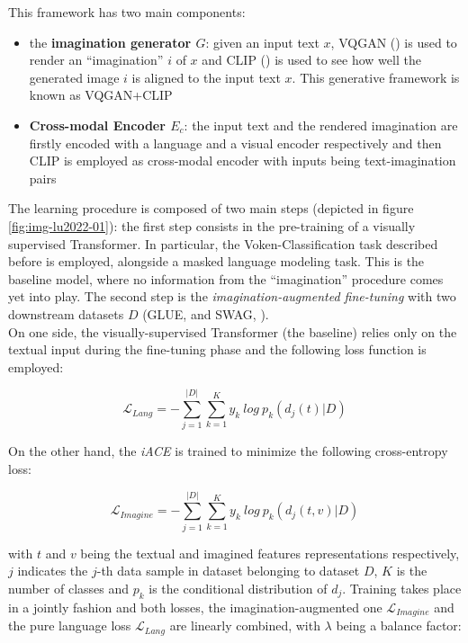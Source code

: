 \documentclass[
]{krantz}
\providecommand{\tightlist}{%
  \setlength{\itemsep}{0pt}\setlength{\parskip}{0pt}}
\begin{document}
This framework has two main components:

\begin{itemize}
\tightlist
\item
  the \textbf{imagination generator \(G\)}: given an input text \(x\), VQGAN (\citet{esser2021taming}) is used to render an ``imagination'' \(i\) of \(x\) and CLIP (\citet{radford2021learning}) is used to see how well the generated image \(i\) is aligned to the input text \(x\). This generative framework is known as VQGAN+CLIP
\item
  \textbf{Cross-modal Encoder \(E_c\)}: the input text and the rendered imagination are firstly encoded with a language and a visual encoder respectively and then CLIP is employed as cross-modal encoder with inputs being text-imagination pairs
\end{itemize}

The learning procedure is composed of two main steps (depicted in figure \ref{fig:img-lu2022-01}): the first step consists in the pre-training of a visually supervised Transformer. In particular, the Voken-Classification task described before is employed, alongside a masked language modeling task. This is the baseline model, where no information from the ``imagination'' procedure comes yet into play. The second step is the \emph{imagination-augmented fine-tuning} with two downstream datasets \(D\) (GLUE, \citet{wang2018glue} and SWAG, \citet{zellers2018swag}).\\
On one side, the visually-supervised Transformer (the baseline) relies only on the textual input during the fine-tuning phase and the following loss function is employed:

\[ \mathcal{L}_{Lang}=-\sum_{j=1}^{|D|}\sum_{k=1}^{K}y_{k}\ log\ p_{k}(d_{j}(t)|D) \]

On the other hand, the \emph{iACE} is trained to minimize the following cross-entropy loss:

\[ \mathcal{L}_{Imagine}=-\sum_{j=1}^{|D|}\sum_{k=1}^{K}y_{k}\ log\ p_{k}(d_{j}(t,v)|D) \]

with \(t\) and \(v\) being the textual and imagined features representations respectively, \(j\) indicates the \(j\)-th data sample in dataset belonging to dataset \(D\), \(K\) is the number of classes and \(p_k\) is the conditional distribution of \(d_j\).
Training takes place in a jointly fashion and both losses, the imagination-augmented one \(\mathcal{L}_{Imagine}\) and the pure language loss \(\mathcal{L}_{Lang}\) are linearly combined, with \(\lambda\) being a balance factor:
\end{document}
